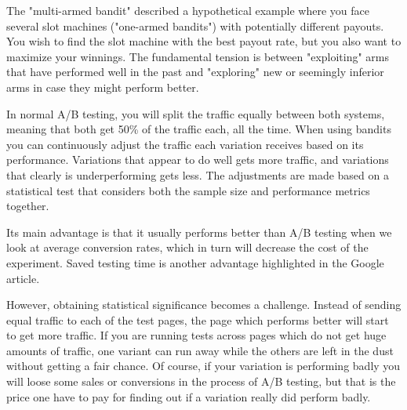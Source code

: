 The "multi-armed bandit" described a hypothetical example where you face
several slot machines ("one-armed bandits") with potentially different payouts.
You wish to find the slot machine with the best payout rate, but you also want
to maximize your winnings. The fundamental tension is between "exploiting" arms
that have performed well in the past and "exploring" new or seemingly inferior
arms in case they might perform better.

In normal A/B testing, you will split the traffic equally between both systems,
meaning that both get 50\% of the traffic each, all the time. When using
bandits you can continuously adjust the traffic each variation receives based
on its performance. Variations that appear to do well gets more traffic, and
variations that clearly is underperforming gets less. The adjustments are made
based on a statistical test that considers both the sample size and performance
metrics together.

Its main advantage is that it usually performs better than A/B testing when we
look at average conversion rates, which in turn will decrease the cost of the
experiment.  Saved testing time is another advantage highlighted in the Google
article.

However, obtaining statistical significance becomes a challenge. Instead of
sending equal traffic to each of the test pages, the page which performs better
will start to get more traffic. If you are running tests across pages which do
not get huge amounts of traffic, one variant can run away while the others are
left in the dust without getting a fair chance. Of course, if your variation is
performing badly you will loose some sales or conversions in the process of A/B
testing, but that is the price one have to pay for finding out if a variation
really did perform badly.
